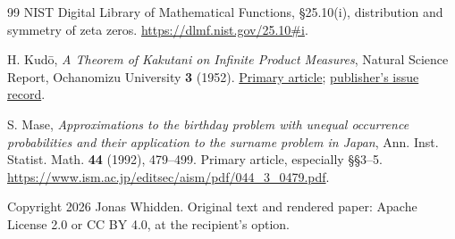 \documentclass[11pt]{article}
\theoremstyle{definition}
\begin{document}
\begin{thebibliography}{99}
NIST Digital Library of Mathematical Functions,
\S25.10(i), distribution and symmetry of zeta zeros.
\url{https://dlmf.nist.gov/25.10#i}.

H. Kud\=o, \emph{A Theorem of Kakutani on Infinite Product Measures},
Natural Science Report, Ochanomizu University \textbf{3} (1952).
\href{https://teapot.lib.ocha.ac.jp/record/35128/files/KJ00004829299.pdf}{Primary article};
\href{https://www.lib.ocha.ac.jp/oab/12shizenkagaku/1952-07-01.html}{publisher's issue record}.

S. Mase, \emph{Approximations to the birthday problem with unequal
occurrence probabilities and their application to the surname problem
in Japan}, Ann. Inst. Statist. Math. \textbf{44} (1992), 479--499.
Primary article, especially \S\S3--5.
\url{https://www.ism.ac.jp/editsec/aism/pdf/044_3_0479.pdf}.

\end{thebibliography}

\bigskip
\noindent Copyright 2026 Jonas Whidden. Original text and rendered paper:
Apache License 2.0 or CC BY 4.0, at the recipient's option.
\end{document}
